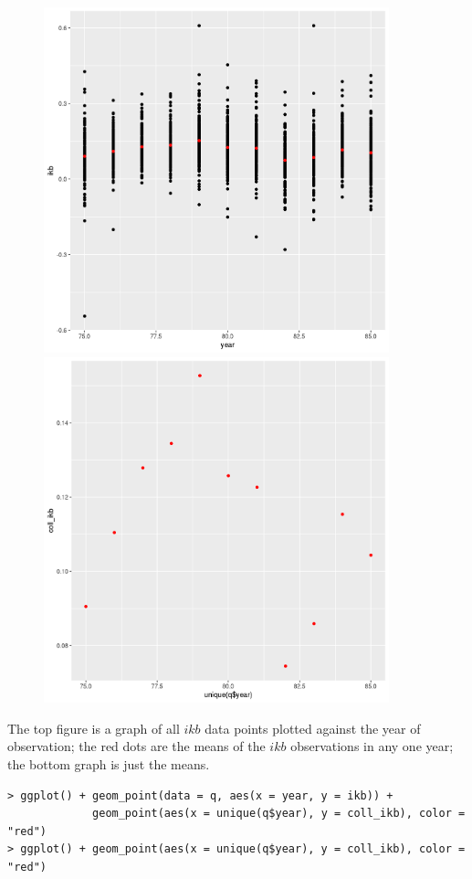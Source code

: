 \documentclass[12pt,letterpaper]{article}
\theoremstyle{definition}
\begin{document}
\begin{figure}[H]
  \begin{center}
    \includegraphics[width=10cm]{all.png}
    \includegraphics[width=10cm]{coll.png}
  \end{center}
\end{figure}

The top figure is a graph of all $ikb$ data points plotted against the year of observation; the red dots are the means of the $ikb$ observations in any one year; the bottom graph is just the means.

\begin{Verbatim}[fontsize=\small]
> ggplot() + geom_point(data = q, aes(x = year, y = ikb)) +
             geom_point(aes(x = unique(q$year), y = coll_ikb), color = "red")
> ggplot() + geom_point(aes(x = unique(q$year), y = coll_ikb), color = "red")
\end{Verbatim}
\end{document}
